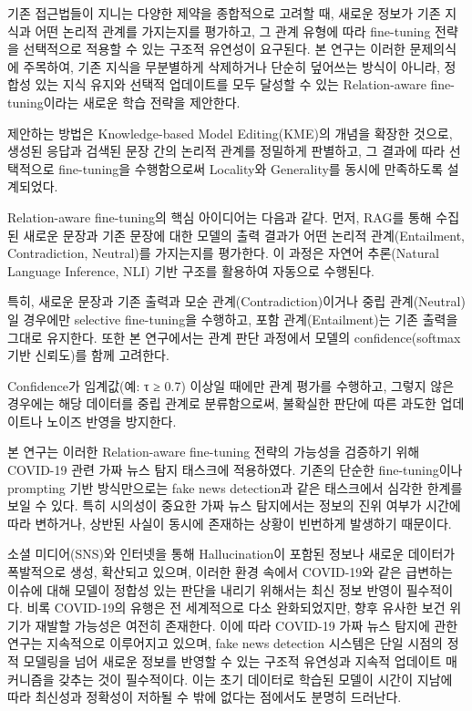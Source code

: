 \documentclass[a4paper,fleqn]{cas-sc}
\begin{document}
기존 접근법들이 지니는 다양한 제약을 종합적으로 고려할 때, 새로운 정보가 기존 지식과 어떤 논리적 관계를 가지는지를 평가하고, 그 관계 유형에 따라 fine-tuning 전략을 선택적으로 적용할 수 있는 구조적 유연성이 요구된다. 본 연구는 이러한 문제의식에 주목하여, 기존 지식을 무분별하게 삭제하거나 단순히 덮어쓰는 방식이 아니라, 정합성 있는 지식 유지와 선택적 업데이트를 모두 달성할 수 있는 Relation-aware fine-tuning이라는 새로운 학습 전략을 제안한다. 

제안하는 방법은 Knowledge-based Model Editing(KME)의 개념을 확장한 것으로, 생성된 응답과 검색된 문장 간의 논리적 관계를 정밀하게 판별하고, 그 결과에 따라 선택적으로 fine-tuning을 수행함으로써 Locality와 Generality를 동시에 만족하도록 설계되었다.

Relation-aware fine-tuning의 핵심 아이디어는 다음과 같다.
먼저, RAG를 통해 수집된 새로운 문장과 기존 문장에 대한 모델의 출력 결과가 어떤 논리적 관계(Entailment, Contradiction, Neutral)를 가지는지를 평가한다.
이 과정은 자연어 추론(Natural Language Inference, NLI) 기반 구조를 활용하여 자동으로 수행된다.

특히, 새로운 문장과 기존 출력과 모순 관계(Contradiction)이거나 중립 관계(Neutral)일 경우에만 selective fine-tuning을 수행하고, 포함 관계(Entailment)는 기존 출력을 그대로 유지한다.
또한 본 연구에서는 관계 판단 과정에서 모델의 confidence(softmax 기반 신뢰도)를 함께 고려한다. 

Confidence가 임계값(예: τ ≥ 0.7) 이상일 때에만 관계 평가를 수행하고, 그렇지 않은 경우에는 해당 데이터를 중립 관계로 분류함으로써, 불확실한 판단에 따른 과도한 업데이트나 노이즈 반영을 방지한다.

본 연구는 이러한 Relation-aware fine-tuning 전략의 가능성을 검증하기 위해 COVID-19 관련 가짜 뉴스 탐지 태스크에 적용하였다. 
기존의 단순한 fine-tuning이나 prompting 기반 방식만으로는 fake news detection과 같은 태스크에서 심각한 한계를 보일 수 있다. 특히 시의성이 중요한 가짜 뉴스 탐지에서는 정보의 진위 여부가 시간에 따라 변하거나, 상반된 사실이 동시에 존재하는 상황이 빈번하게 발생하기 때문이다.

소셜 미디어(SNS)와 인터넷을 통해 Hallucination이 포함된 정보나 새로운 데이터가 폭발적으로 생성, 확산되고 있으며, 이러한 환경 속에서 COVID-19와 같은 급변하는 이슈에 대해 모델이 정합성 있는 판단을 내리기 위해서는 최신 정보 반영이 필수적이다. 비록 COVID-19의 유행은 전 세계적으로 다소 완화되었지만, 향후 유사한 보건 위기가 재발할 가능성은 여전히 존재한다.
이에 따라 COVID-19 가짜 뉴스 탐지에 관한 연구는 지속적으로 이루어지고 있으며, fake news detection 시스템은 단일 시점의 정적 모델링을 넘어 새로운 정보를 반영할 수 있는 구조적 유연성과 지속적 업데이트 매커니즘을 갖추는 것이 필수적이다. 이는 초기 데이터로 학습된 모델이 시간이 지남에 따라 최신성과 정확성이 저하될 수 밖에 없다는 점에서도 분명히 드러난다.
\end{document}
